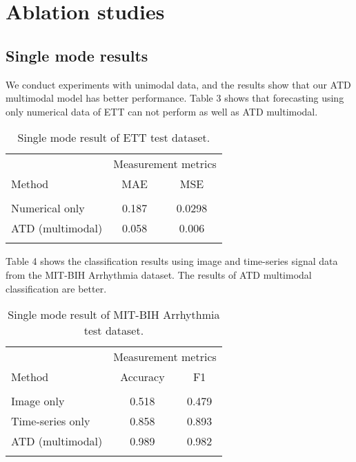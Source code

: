 \documentclass{ecai}
\begin{document}
\section{Ablation studies}
\subsection{Single mode results}
We conduct experiments with unimodal data, and the results show that our ATD multimodal model has better performance. Table 3 shows that forecasting using only numerical data of ETT can not perform as well as ATD multimodal.
\begin{table}
\begin{center}
{\caption{Single mode result of ETT test dataset.}\label{table3}}
\begin{tabular}{lcc}
\hline
\rule{0pt}{12pt}
&\multicolumn{2}{c}{Measurement metrics}\\
\cline{2-3}
\rule{0pt}{12pt}
Method &MAE &MSE
\\
\hline
\\[-6pt]
\quad Numerical only & 0.187 & 0.0298\\

\quad ATD (multimodal)  & 0.058  & 0.006\\
\hline
\\[-6pt]

\end{tabular}
\end{center}
\end{table}

Table 4 shows the classification results using image and time-series signal data from the MIT-BIH Arrhythmia dataset. The results of ATD multimodal classification are better.

\begin{table}
\begin{center}
{\caption{Single mode result of MIT-BIH Arrhythmia test dataset. }\label{table4}}
\begin{tabular}{lcc}
\hline
\rule{0pt}{12pt}
&\multicolumn{2}{c}{Measurement metrics}\\
\cline{2-3}
\rule{0pt}{12pt}
Method &Accuracy&F1
\\
\hline
\\[-6pt]
\quad Image only  &0.518 & 0.479  \\
\quad Time-series only  &0.858 & 0.893  \\

\quad ATD (multimodal)  &0.989 & 0.982   \\
\hline
\\[-6pt]

\end{tabular}
\end{center}
\end{table}
\end{document}
